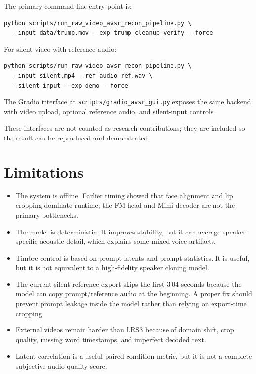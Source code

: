 \documentclass{article}
\begin{document}
The primary command-line entry point is:
\begin{verbatim}
python scripts/run_raw_video_avsr_recon_pipeline.py \
  --input data/trump.mov --exp trump_cleanup_verify --force
\end{verbatim}
For silent video with reference audio:
\begin{verbatim}
python scripts/run_raw_video_avsr_recon_pipeline.py \
  --input silent.mp4 --ref_audio ref.wav \
  --silent_input --exp demo --force
\end{verbatim}
The Gradio interface at \texttt{scripts/gradio\_avsr\_gui.py} exposes the same
backend with video upload, optional reference audio, and silent-input controls.

These interfaces are not counted as research contributions; they are included
so the result can be reproduced and demonstrated.

\section{Limitations}

\begin{itemize}
    \item The system is offline. Earlier timing showed that face alignment and
    lip cropping dominate runtime; the FM head and Mimi decoder are not the
    primary bottlenecks.
    \item The model is deterministic. It improves stability, but it can average
    speaker-specific acoustic detail, which explains some mixed-voice artifacts.
    \item Timbre control is based on prompt latents and prompt statistics. It is
    useful, but it is not equivalent to a high-fidelity speaker cloning model.
    \item The current silent-reference export skips the first 3.04 seconds
    because the model can copy prompt/reference audio at the beginning. A proper
    fix should prevent prompt leakage inside the model rather than relying on
    export-time cropping.
    \item External videos remain harder than LRS3 because of domain shift,
    crop quality, missing word timestamps, and imperfect decoded text.
    \item Latent correlation is a useful paired-condition metric, but it is not
    a complete subjective audio-quality score.
\end{itemize}
\end{document}
